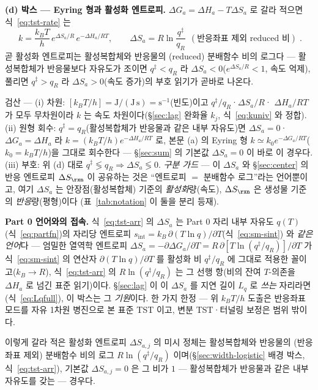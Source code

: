 \begin{bgbox}
\textbf{(d) 박스 --- Eyring 형과 활성화 엔트로피.} $\Delta G_a=\Delta H_a-T\Delta S_a$ 로 갈라 적으면
식~\eqref{eq:tst-rate} 는
\begin{equation}
\boxed{\;k=\frac{k_BT}{h}\,e^{\Delta S_a/R}\,e^{-\Delta H_a/RT},
\qquad
\Delta S_a=R\ln\!\frac{q^\ddagger}{q_R}\ \ (\text{반응좌표 제외 reduced 비})\;.}
\label{eq:tst-arr}
\end{equation}
곧 활성화 엔트로피는 활성복합체와 반응물의 (reduced) 분배함수 비의 로그다 --- 활성복합체가 반응물보다
자유도가 조이면 $q^\ddagger<q_R$ 라 $\Delta S_a<0$($e^{\Delta S_a/R}<1$, 속도 억제), 풀리면 $q^\ddagger>q_R$ 라
$\Delta S_a>0$(속도 증가)의 부호 읽기가 곧바로 나온다.
\begin{verifybox}
검산 --- (i) 차원: $[k_BT/h]=\mathrm J/(\mathrm{J\,s})=\mathrm s^{-1}$(빈도)이고 $q^\ddagger/q_R$·$\Delta S_a/R$·
$\Delta H_a/RT$ 가 모두 무차원이라 $k$ 는 속도 차원이다(\S\ref{sec:lag} 완화율 $k_j$, 식~\eqref{eq:kuniv} 와
정합). (ii) 원형 회수: $q^\ddagger=q_R$(활성복합체가 반응물과 같은 내부 자유도)면 $\Delta S_a=0$·$\Delta G_a=\Delta H_a$
라 $k=(k_BT/h)e^{-\Delta H_a/RT}$ 로, 본문 (a) 의 Eyring 형 $k\simeq k_0e^{-\Delta G_a/RT}$($k_0{=}k_BT/h$)을
그대로 회수한다 --- \S\ref{sec:sum} 의 기본값 $\Delta S_a{=}0$ 이 바로 이 경우다. (iii) 부호: 위 (d) 대로
$q^\ddagger\lessgtr q_R\Rightarrow\Delta S_a\lessgtr0$. \emph{구분 가드} --- 이 $\Delta S_a$ 와 \S\ref{sec:center}
의 반응 엔트로피 $\Delta S_\rxn$ 이 공유하는 것은 ``엔트로피 $=$ 분배함수 로그''라는 언어뿐이고, 여기 $\Delta S_a$
는 안장점(활성복합체) 기준의 \emph{활성화}량(속도), $\Delta S_\rxn$ 은 생성물 기준의 \emph{반응}량(평형)이다
(표~\ref{tab:notation} 이 둘을 분리 등재).
\end{verifybox}

\textbf{Part 0 언어와의 접속.} 식~\eqref{eq:tst-arr} 의 $\Delta S_a$ 는 Part 0 자리 내부 자유도
$q(T)$(식~\eqref{eq:partfn})의 자리당 엔트로피 $s_\mathrm{int}=k_B\,\partial(T\ln q)/\partial T$(식~\eqref{eq:sm-sint})
와 \emph{같은 언어}다 --- 엄밀한 열역학 엔트로피 $\Delta S_a=-\partial\Delta G_a/\partial T
=R\,\partial[T\ln(q^\ddagger/q_R)]/\partial T$ 가 식~\eqref{eq:sm-sint} 의 연산자 $\partial(T\ln q)/\partial T$ 를 활성화
비 $q^\ddagger/q_R$ 에 그대로 적용한 꼴이고($k_B\!\to\!R$), 식~\eqref{eq:tst-arr} 의 $R\ln(q^\ddagger/q_R)$ 는 그
선행 항(비의 잔여 $T$-의존을 $\Delta H_a$ 로 넘긴 표준 읽기)이다. \S\ref{sec:lag} 이 이 $\Delta S_a$ 를 지연 길이
$L_q$ 로 \emph{쓰는} 자리라면(식~\eqref{eq:Lqfull}), 이 박스는 그 \emph{기원}이다. 한 가지 한정 --- 위 $k_BT/h$
도출은 반응좌표 모드를 자유 1차원 병진으로 본 표준 TST 이고, 변분 TST·터널링 보정은 범위 밖이다.
\end{bgbox}

이렇게 갈라 적은 활성화 엔트로피 $\Delta S_{a,j}$ 의 미시 정체는 활성복합체와 반응물의 (반응좌표 제외)
분배함수 비의 로그 $R\ln(q^\ddagger/q_R)$ 이며(\S\ref{sec:width-logistic} 배경 박스, 식~\eqref{eq:tst-arr}),
기본값 $\Delta S_{a,j}{=}0$ 은 그 비가 $1$ --- 활성복합체가 반응물과 같은 내부 자유도를 갖는 --- 경우다.
